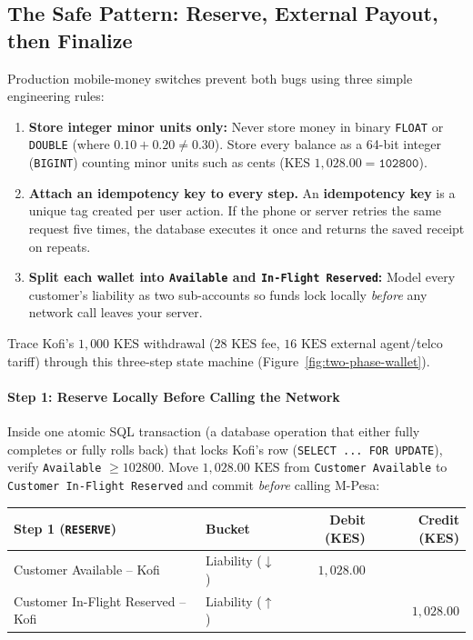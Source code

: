 \subsection{The Safe Pattern: Reserve, External Payout, then Finalize}

Production mobile-money switches prevent both bugs using three simple engineering rules:
\begin{enumerate}
  \item \textbf{Store integer minor units only:} Never store money in binary \texttt{FLOAT} or \texttt{DOUBLE} (where $0.10 + 0.20 \neq 0.30$). Store every balance as a 64-bit integer (\texttt{BIGINT}) counting minor units such as cents ($\text{KES } 1{,}028.00 = \texttt{102800}$).
  \item \textbf{Attach an idempotency key to every step.} An \textbf{idempotency key} is a unique tag created per user action. If the phone or server retries the same request five times, the database executes it once and returns the saved receipt on repeats.
  \item \textbf{Split each wallet into \texttt{Available} and \texttt{In-Flight Reserved}:} Model every customer's liability as two sub-accounts so funds lock locally \emph{before} any network call leaves your server.
\end{enumerate}

Trace Kofi's $1{,}000\text{ KES}$ withdrawal ($28\text{ KES}$ fee, $16\text{ KES}$ external agent/telco tariff) through this three-step state machine (Figure~\ref{fig:two-phase-wallet}).

\paragraph{Step 1: Reserve Locally Before Calling the Network}
Inside one atomic SQL transaction (a database operation that either fully completes or fully rolls back) that locks Kofi's row (\texttt{SELECT ... FOR UPDATE}), verify \texttt{Available} $\ge 102800$. Move $1{,}028.00\text{ KES}$ from \texttt{Customer Available} to \texttt{Customer In-Flight Reserved} and commit \emph{before} calling M-Pesa:

\begin{center}
\small
\begin{tabular}{llrr}
\toprule
\textbf{Step 1 (\texttt{RESERVE})} & \textbf{Bucket} & \textbf{Debit (KES)} & \textbf{Credit (KES)} \\
\midrule
Customer Available -- Kofi & Liability ($\downarrow$) & $1{,}028.00$ & \\
Customer In-Flight Reserved -- Kofi & Liability ($\uparrow$) & & $1{,}028.00$ \\
\bottomrule
\end{tabular}
\end{center}

